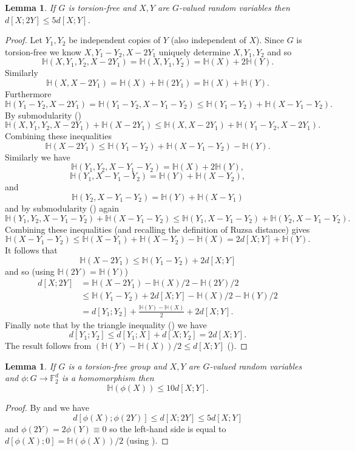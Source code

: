 \documentclass[10pt,a4paper]{article}
\newtheorem{lemma}[theorem]{Lemma}
\newcommand{\lean}[1]{}
\newcommand{\uses}[1]{}
\newcommand{\leanok}{}
\begin{document}
\begin{lemma}\label{torsion-free-doubling}\lean{torsion_free_doubling}\leanok
If $G$ is torsion-free and $X,Y$ are $G$-valued random variables then $d[X;2Y]\leq 5d[X;Y]$.
\end{lemma}
\begin{proof}
\uses{alt-submodularity,ruzsa-triangle,ruzsa-diff}\leanok
Let $Y_1,Y_2$ be independent copies of $Y$ (also independent of $X$). Since $G$ is torsion-free we know $X,Y_1-Y_2,X-2Y_1$ uniquely determine $X,Y_1,Y_2$ and so
\[\mathbb{H}(X,Y_1,Y_2,X-2Y_1)=\mathbb{H}(X,Y_1,Y_2)=\mathbb{H}(X)+2\mathbb{H}(Y).\]
Similarly
\[\mathbb{H}(X,X-2Y_1)=\mathbb{H}(X)+\mathbb{H}(2Y_1)=\mathbb{H}(X)+\mathbb{H}(Y).\]
Furthermore
\[\mathbb{H}(Y_1-Y_2,X-2Y_1)=\mathbb{H}(Y_1-Y_2,X-Y_1-Y_2)\leq \mathbb{H}(Y_1-Y_2)+\mathbb{H}(X-Y_1-Y_2).\]
By submodularity ()
\[\mathbb{H}(X,Y_1,Y_2,X-2Y_1)+\mathbb{H}(X-2Y_1)\leq \mathbb{H}(X,X-2Y_1)+\mathbb{H}(Y_1-Y_2,X-2Y_1).\]
Combining these inequalities
\[\mathbb{H}(X-2Y_1)\leq \mathbb{H}(Y_1-Y_2)+\mathbb{H}(X-Y_1-Y_2)-\mathbb{H}(Y).\]
Similarly we have
\[\mathbb{H}(Y_1,Y_2,X-Y_1-Y_2)=\mathbb{H}(X)+2\mathbb{H}(Y),\]
\[\mathbb{H}(Y_1,X-Y_1-Y_2)=\mathbb{H}(Y)+\mathbb{H}(X-Y_2),\]
and
\[\mathbb{H}(Y_2,X-Y_1-Y_2)=\mathbb{H}(Y)+\mathbb{H}(X-Y_1)\]
and by submodularity () again
\[\mathbb{H}(Y_1,Y_2,X-Y_1-Y_2)+ \mathbb{H}(X-Y_1-Y_2)\leq \mathbb{H}(Y_1,X-Y_1-Y_2)+\mathbb{H}(Y_2,X-Y_1-Y_2).\]
Combining these inequalities (and recalling the definition of Ruzsa distance) gives
\[\mathbb{H}(X-Y_1-Y_2)\leq \mathbb{H}(X-Y_1)+\mathbb{H}(X-Y_2)-\mathbb{H}(X)=2d[X;Y]+\mathbb{H}(Y).\]
It follows that
\[\mathbb{H}(X-2Y_1)\leq \mathbb{H}(Y_1-Y_2)+2d[X;Y]\]
and so (using $\mathbb{H}(2Y)=\mathbb{H}(Y)$)
\begin{align*}
d[X;2Y]
&=\mathbb{H}(X-2Y_1)-\mathbb{H}(X)/2-\mathbb{H}(2Y)/2\\
&\leq \mathbb{H}(Y_1-Y_2)+2d[X;Y]-\mathbb{H}(X)/2-\mathbb{H}(Y)/2\\
&= d[Y_1;Y_2]+\frac{\mathbb{H}(Y)-\mathbb{H}(X)}{2}+2d[X;Y].
\end{align*}
Finally note that by the triangle inequality () we have
\[d[Y_1;Y_2]\leq d[Y_1;X]+d[X;Y_2]=2d[X;Y].\]
The result follows from $(\mathbb{H}(Y)-\mathbb{H}(X))/2\leq d[X;Y]$ ().
\end{proof}

\begin{lemma}\label{torsion-dist-shrinking}\lean{torsion_dist_shrinking}\leanok
If $G$ is a torsion-free group and $X,Y$ are $G$-valued random variables and $\phi:G\to \mathbb{F}_2^d$ is a homomorphism then
\[\mathbb{H}(\phi(X))\leq 10d[X;Y].\]
\end{lemma}
\begin{proof}
\uses{fibring-ineq, torsion-free-doubling, dist-zero}\leanok
By  and  we have
\[d[\phi(X);\phi(2Y)]\leq d[X;2Y]\leq 5d[X;Y]\]
and $\phi(2Y)=2\phi(Y)\equiv 0$ so the left-hand side is equal to $d[\phi(X);0]=\mathbb{H}(\phi(X))/2$ (using ).
\end{proof}
\end{document}
